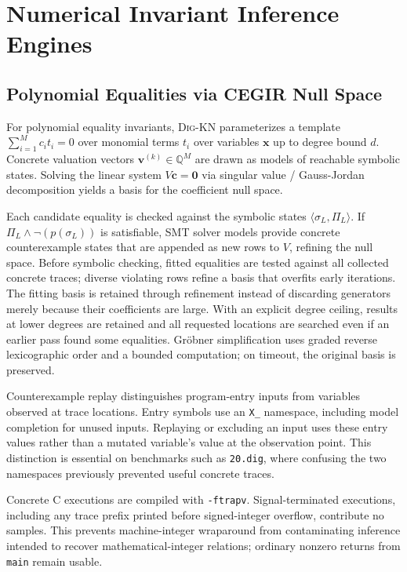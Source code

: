 \documentclass[runningheads]{llncs}
\newcommand{\tool}{\textsc{Dig-KN}\xspace}
\newcommand{\code}[1]{\texttt{\small #1}}
\begin{document}
\section{Numerical Invariant Inference Engines}
\label{sec:inference}

\subsection{Polynomial Equalities via CEGIR Null Space}
\label{sec:eqts}
For polynomial equality invariants, \tool{} parameterizes a template $\sum_{i=1}^M c_i t_i = 0$ over monomial terms $t_i$ over variables $\mathbf{x}$ up to degree bound $d$.  Concrete valuation vectors $\mathbf{v}^{(k)} \in \mathbb{Q}^M$ are drawn as models of reachable symbolic states.  Solving the linear system $V \mathbf{c} = \mathbf{0}$ via singular value / Gauss-Jordan decomposition yields a basis for the coefficient null space.

Each candidate equality is checked against the symbolic states $\langle\sigma_L, \Pi_L\rangle$.  If $\Pi_L \land \neg(p(\sigma_L))$ is satisfiable, SMT solver models provide concrete counterexample states that are appended as new rows to $V$, refining the null space.  Before symbolic checking, fitted equalities are tested against all collected concrete traces; diverse violating rows refine a basis that overfits early iterations.  The fitting basis is retained through refinement instead of discarding generators merely because their coefficients are large.  With an explicit degree ceiling, results at lower degrees are retained and all requested locations are searched even if an earlier pass found some equalities.  Gr\"obner simplification uses graded reverse lexicographic order and a bounded computation; on timeout, the original basis is preserved.

Counterexample replay distinguishes program-entry inputs from variables observed at trace locations.  Entry symbols use an \code{X\_} namespace, including model completion for unused inputs.  Replaying or excluding an input uses these entry values rather than a mutated variable's value at the observation point.  This distinction is essential on benchmarks such as \code{20.dig}, where confusing the two namespaces previously prevented useful concrete traces.

Concrete C executions are compiled with \code{-ftrapv}.  Signal-terminated executions, including any trace prefix printed before signed-integer overflow, contribute no samples.  This prevents machine-integer wraparound from contaminating inference intended to recover mathematical-integer relations; ordinary nonzero returns from \code{main} remain usable.
\end{document}
